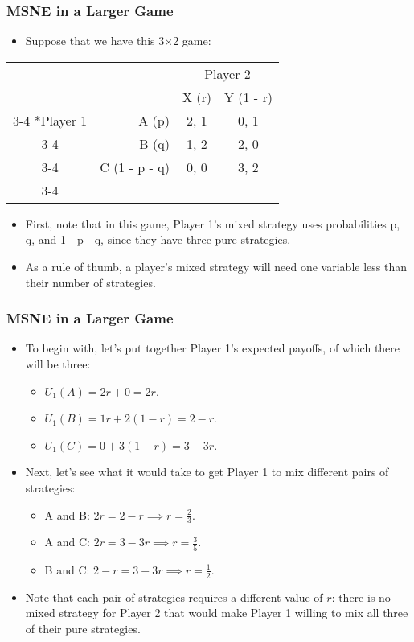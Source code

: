\begin{frame}
\frametitle{MSNE in a Larger Game}
\begin{itemize}
	\item Suppose that we have this 3$\times$2 game:
\end{itemize}
\begin{table}[h]
\centering
\begin{tabular}{cr|c|c|}
	& \multicolumn{1}{c}{} & \multicolumn{2}{c}{Player 2}\\
	& \multicolumn{1}{c}{} & \multicolumn{1}{c}{X (r)}  & \multicolumn{1}{c}{Y (1 - r)} \\\cline{3-4}
	\multirow{3}*{Player 1}  & A (p) & 2, 1 & 0, 1 \\\cline{3-4}
	& B (q) & 1, 2 & 2, 0 \\\cline{3-4}
	& C (1 - p - q) & 0, 0 & 3, 2 \\\cline{3-4}
\end{tabular}
\end{table}
\begin{itemize}
	\item First, note that in this game, Player 1's mixed strategy uses probabilities p, q, and 1 - p - q, since they have three pure strategies.
	\item As a rule of thumb, a player's mixed strategy will need one variable less than their number of strategies.
\end{itemize}
\end{frame}

\begin{frame}
\frametitle{MSNE in a Larger Game}
\begin{itemize}
	\item To begin with, let's put together Player 1's expected payoffs, of which there will be three:
	\begin{itemize}
		\item $U_1(A) = 2r + 0 = 2r$.
		\item $U_1(B) = 1r + 2(1 - r) = 2 - r$.
		\item $U_1(C) = 0 + 3(1 - r) = 3 - 3r$.
	\end{itemize}
	\item Next, let's see what it would take to get Player 1 to mix different pairs of strategies:
	\begin{itemize}
		\item A and B: $2r = 2 - r \implies r = \frac{2}{3}$.
		\item A and C: $2r = 3 - 3r \implies r = \frac{3}{5}$.
		\item B and C: $2 - r = 3 - 3r \implies r = \frac{1}{2}$.
	\end{itemize}
	\item Note that each pair of strategies requires a different value of $r$: there is no mixed strategy for Player 2 that would make Player 1 willing to mix all three of their pure strategies.
\end{itemize}
\end{frame}

